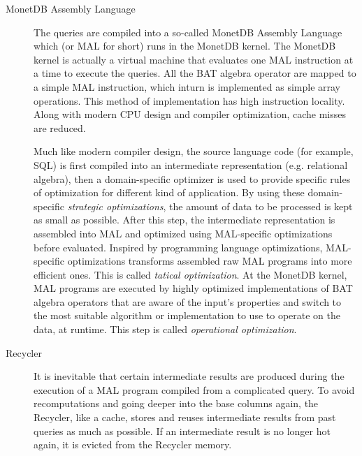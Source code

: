 \documentclass{article}
\begin{document}
\begin{description}
\item[MonetDB Assembly Language] The queries are compiled into a so-called MonetDB Assembly Language which (or MAL for short) runs in the MonetDB kernel. The MonetDB kernel is actually a virtual machine that evaluates one MAL instruction at a time to execute the queries. All the BAT algebra operator are mapped to a simple MAL instruction, which inturn is implemented as simple array operations. This method of implementation has high instruction locality. Along with modern CPU design and compiler optimization, cache misses are reduced.\cite{idreos2012monetdb}

Much like modern compiler design, the source language code (for example, SQL) is first compiled into an intermediate representation (e.g. relational algebra), then a domain-specific optimizer is used to provide specific rules of optimization for different kind of application. By using these domain-specific \textit{strategic optimizations}, the amount of data to be processed is kept as small as possible.\cite{idreos2012monetdb} After this step, the intermediate representation is assembled into MAL and optimized using MAL-specific optimizations before evaluated. Inspired by programming language optimizations, MAL-specific optimizations transforms assembled raw MAL programs into more efficient ones. This is called \textit{tatical optimization}.\cite{idreos2012monetdb} At the MonetDB kernel, MAL programs are executed by highly optimized implementations of BAT algebra operators that are aware of the input's properties and switch to the most suitable algorithm or implementation to use to operate on the data, at runtime. This step is called \textit{operational optimization}.\cite{idreos2012monetdb}

\item[Recycler] It is inevitable that certain intermediate results are produced during the execution of a MAL program compiled from a complicated query. To avoid recomputations and going deeper into the base columns again, the Recycler, like a cache, stores and reuses intermediate results from past queries as much as possible. If an intermediate result is no longer hot again, it is evicted from the Recycler memory. \cite{idreos2012monetdb}


\end{description}
\end{document}
